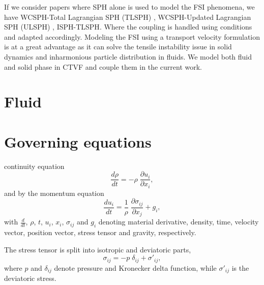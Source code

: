 \documentclass[preprint,12pt]{elsarticle}
\begin{document}
If we consider papers where SPH alone is used to model the FSI phenomena, we
have WCSPH-Total Lagrangian SPH (TLSPH) \cite{zhan2019stabilized},
WCSPH-Updated Lagrangian SPH (ULSPH) \cite{antoci2007numerical},
ISPH-TLSPH\cite{salehizadeh2022coupled}. Where the coupling is handled
using \cite{Adami2013} conditions and adapted accordingly.
Modeling the FSI using a transport velocity formulation is at a great advantage
as it can solve the tensile instability issue in solid dynamics and inharmonious
particle distribution in fluids. We model both fluid and solid phase in CTVF and
couple them in the current work.

\section{Fluid }

\section{Governing equations}

continuity equation
\begin{equation}
  \label{eq:ce}
  \frac{d \rho}{d t} = - \rho \; \frac{\partial u_i}{\partial x_i},
\end{equation}
and by the momentum equation
\begin{equation}
  \label{eq:me}
  \frac{d u_i}{d t} = \frac{1}{\rho} \; \frac{\partial \sigma_{ij}}{\partial x_j}
  + g_i,
\end{equation}
with $\frac{{d} }{d t}$, $\rho$, $t$, $u_i$, $x_i$, $\sigma_{ij}$ and $g_{i}$
denoting material derivative, density, time, velocity vector, position vector,
stress tensor and gravity, respectively.


The stress tensor is split into isotropic and deviatoric parts,
\begin{equation}
  \label{eq:stress_tensor_decomposition}
  \sigma_{ij} = - p \; \delta_{ij} + \sigma'_{ij},
\end{equation}
where $p$ and $\delta_{ij}$ denote pressure and Kronecker delta function, while
$\sigma'_{ij}$ is the deviatoric stress.
\end{document}
